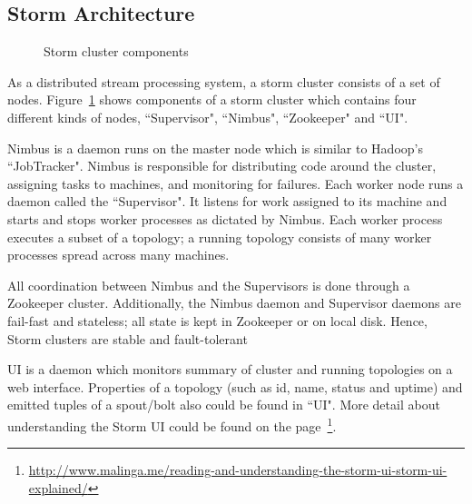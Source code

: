 \subsection{Storm Architecture}
\begin{figure}
  \begin{center}
   \caption{Storm cluster components}
   \label{fig:storm_cluster}
  \end{center}
\end{figure}

As a distributed stream processing system, a storm cluster consists of a set of nodes. Figure~\ref{fig:storm_cluster} shows components of a storm cluster which contains four different kinds of nodes, ``Supervisor", ``Nimbus", ``Zookeeper" and ``UI". 

Nimbus is a daemon runs on the master node which is similar to Hadoop's ``JobTracker". Nimbus is responsible for distributing code around the cluster, assigning tasks to machines, and monitoring for failures. Each worker node runs a daemon called the ``Supervisor". It listens for work assigned to its machine and starts and stops worker processes as dictated by Nimbus. Each worker process executes a subset of a topology; a running topology consists of many worker processes spread across many machines.

All coordination between Nimbus and the Supervisors is done through a Zookeeper cluster. Additionally, the Nimbus daemon and Supervisor daemons are fail-fast and stateless; all state is kept in Zookeeper or on local disk. Hence, Storm clusters are stable and fault-tolerant

UI is a daemon which monitors summary of cluster and running topologies on a web interface. Properties of a topology (such as id, name, status and uptime) and emitted tuples of a spout/bolt also could be found in ``UI". More detail about understanding the Storm UI could be found on the page~\footnote{\url{http://www.malinga.me/reading-and-understanding-the-storm-ui-storm-ui-explained/}}.



